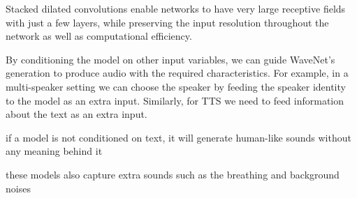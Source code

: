 Stacked dilated convolutions enable networks to have very large receptive fields with just a few layers, while preserving the input resolution throughout the network as well as computational efficiency.

By conditioning the model on other input variables, we can guide WaveNet's generation to produce audio with the required characteristics. For example, in a multi-speaker setting we can choose the speaker by feeding the speaker identity to the model as an extra input. Similarly, for TTS we need to feed information about the text as an extra input.

if a model is not conditioned on text, it will generate human-like sounds without any meaning behind it

these models also capture extra sounds such as the breathing and background noises